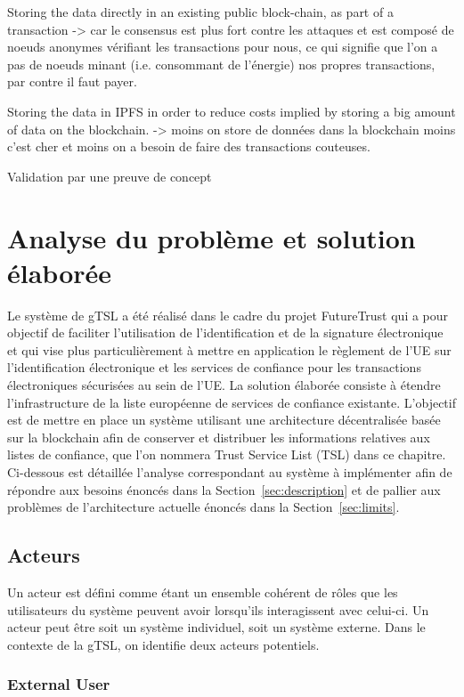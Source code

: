 \documentclass{tnreport}
\begin{document}
Storing the data directly in an existing public block-chain, as part of a transaction
-> car le consensus est plus fort contre les attaques et est composé de noeuds anonymes vérifiant les transactions pour nous, ce qui signifie que l'on a pas de noeuds minant (i.e. consommant de l'énergie) nos propres transactions, par contre il faut payer.

Storing the data in IPFS in order to reduce costs implied by storing a big amount of data on the blockchain.
-> moins on store de données dans la blockchain moins c'est cher et moins on a besoin de faire des transactions couteuses.

Validation par une preuve de concept

\chapter{Analyse du problème et solution élaborée}
\label{sec:analyse}

Le système de gTSL a été réalisé dans le cadre du projet FutureTrust qui a pour objectif de faciliter l'utilisation de l'identification et de la signature électronique et qui vise plus particulièrement à mettre en application le règlement de l'UE sur l'identification électronique et les services de confiance pour les transactions électroniques sécurisées au sein de l'UE.
La solution élaborée consiste à étendre l'infrastructure de la liste européenne de services de confiance existante. L'objectif est de mettre en place un système utilisant une architecture décentralisée basée sur la blockchain afin de conserver et distribuer les informations relatives aux listes de confiance, que l'on nommera Trust Service List (TSL) dans ce chapitre. Ci-dessous est détaillée l'analyse correspondant au système à implémenter afin de répondre aux besoins énoncés dans la Section~\ref{sec:description} et de pallier aux problèmes de l'architecture actuelle énoncés dans la Section~\ref{sec:limits}.

\section{Acteurs}

Un acteur est défini comme étant un ensemble cohérent de rôles que les utilisateurs du système peuvent avoir lorsqu'ils interagissent avec celui-ci. Un acteur peut être soit un système individuel, soit un système externe. Dans le contexte de la gTSL, on identifie deux acteurs potentiels.

\subsection{External User}
\end{document}
